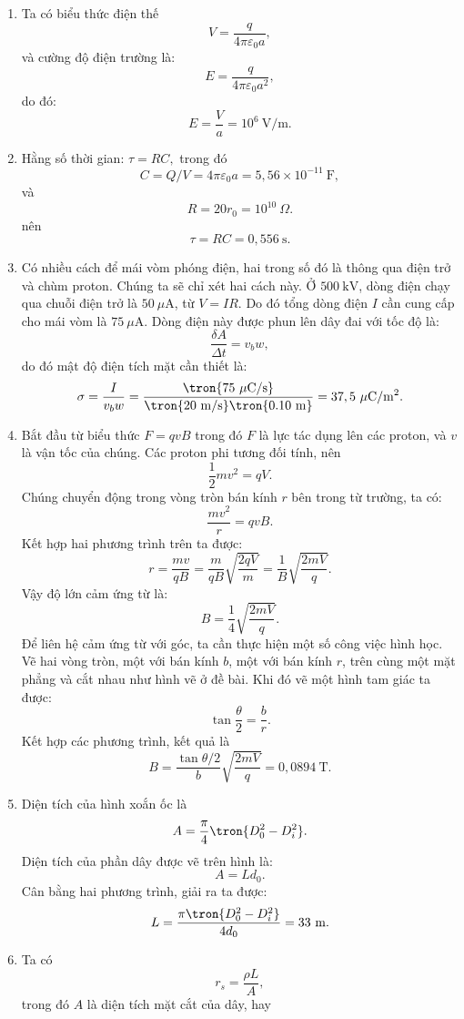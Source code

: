 \begin{loigiai}
    

\begin{enumerate}[1)]
    \item Ta có biểu thức điện thế
    $$ V=\dfrac{q}{4\pi\varepsilon_0a},$$
    và cường độ điện trường là:
    $$E=\dfrac{q}{4\pi\varepsilon_0a^2},$$
    do đó:
    $$E=\dfrac{V}{a}=10^6 ~\mathrm{V/m}.$$
    \item Hằng số thời gian: $\tau=RC,$ trong đó
    $$C=Q/V=4\pi\varepsilon_0a=5,56\times10^{-11}~\mathrm{F},$$
    và 
    $$R=20r_0=10^{10}~\Omega.$$
    nên 
    $$\tau=RC=0,556~\mathrm{s}.$$
    \item Có nhiều cách để mái vòm phóng điện, hai trong số đó là thông qua điện trở và chùm proton. Chúng ta sẽ chỉ xét hai cách này.
    Ở $500~\mathrm{kV}$, dòng điện chạy qua chuỗi điện trở là $50~\mu \mathrm{A}$, từ $V=IR$. Do đó tổng dòng điện $I$ cần cung cấp cho mái vòm là $75~\mu \mathrm{A}$. Dòng điện này được phun lên dây đai với tốc độ là:
    $$\dfrac{\delta A}{\Delta t}=v_bw,$$
    do đó mật độ điện tích mặt cần thiết là:
    $$\sigma=\dfrac{I}{v_bw}=\dfrac{\tron{75~\mu\mathrm{ C/s}}}{\tron{20~\mathrm{m/s}}\tron{0.10~\mathrm{m}}}=37,5~\mu \mathrm{C/m^2}.$$
    \item Bắt đầu từ biểu thức $F=qvB$ trong đó $F$ là lực tác dụng lên các proton, và $v$ là vận tốc của chúng. Các proton phi tương đối tính, nên
    $$\dfrac{1}{2}mv^2=qV.$$
    Chúng chuyển động trong vòng tròn bán kính $r$ bên trong từ trường, ta có:
    $$\dfrac{mv^2}{r}=qvB.$$
    Kết hợp hai phương trình trên ta được:
    $$r=\dfrac{mv}{qB}=\dfrac{m}{qB}\sqrt{\dfrac{2qV}{m}}=\dfrac{1}{B}\sqrt{\dfrac{2mV}{q}}.$$
    Vậy độ lớn cảm ứng từ là:
    $$B=\dfrac{1}{4}\sqrt{\dfrac{2mV}{q}}.$$
    Để liên hệ cảm ứng từ với góc, ta cần thực hiện một số công việc hình học. Vẽ hai vòng tròn, một với bán kính $b$, một với bán kính $r$, trên cùng một mặt phẳng và cắt nhau như hình vẽ ở đề bài. Khi đó vẽ một hình tam giác ta được:
    $$\tan \dfrac{\theta}{2}=\dfrac{b}{r}.$$
    Kết hợp các phương trình, kết quả là
    $$B=\dfrac{\tan \theta/2}{b}\sqrt{\dfrac{2mV}{q}}=0,0894 ~\mathrm{T}.$$
    \item Diện tích của hình xoắn ốc là
    $$A=\dfrac{\pi}{4}\tron{D_0^2-D_i^2}.$$
    Diện tích của phần dây được vẽ trên hình là:
    $$A=Ld_0.$$
    Cân bằng hai phương trình, giải ra ta được:
    $$L=\dfrac{\pi\tron{D_0^2-D_i^2}}{4d_0}=33~\mathrm{m}.$$
    \item Ta có
    $$r_s=\dfrac{\rho L}{A},$$
    trong đó $A$ là diện tích mặt cắt của dây, hay

\end{enumerate}
\end{loigiai}
